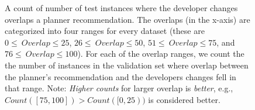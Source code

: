 \begin{figure}[!htbp]
\caption{A count of number of test instances where the developer changes overlaps a planner recommendation. The overlaps (in the x-axis) are categorized into four ranges for every dataset (these are $0\leq~Overlap\leq25$, $26\leq~Overlap\leq50$, $51\leq~Overlap\leq75$, and $76\leq~Overlap\leq100$). For each of the overlap ranges, we count the the number of instances in the validation set where overlap between the planner's recommendation and the developers changes fell in that range. Note: \textit{Higher counts} for larger overlap is \textit{better}, e.g.,  $Count([75,100]) > Count([0,25))$ is considered better.}
\label{fig:results}
\end{figure}